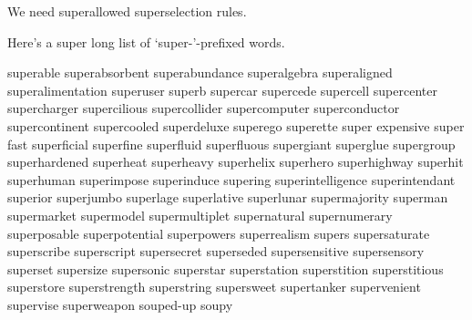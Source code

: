 We need superallowed superselection rules.

Here's a super long list of `super-'-prefixed words.

superable
superabsorbent
superabundance
superalgebra
superaligned
superalimentation
superuser
superb
supercar
supercede
supercell
supercenter
supercharger
supercilious
supercollider
supercomputer
superconductor
supercontinent
supercooled
superdeluxe
superego
superette
super expensive
super fast
superficial
superfine
superfluid
superfluous
supergiant
superglue
supergroup
superhardened
superheat
superheavy
superhelix
superhero
superhighway
superhit
superhuman
superimpose
superinduce
supering
superintelligence
superintendant
superior
superjumbo
superlage
superlative
superlunar
supermajority
superman
supermarket
supermodel
supermultiplet
supernatural
supernumerary
superposable
superpotential
superpowers
superrealism
supers
supersaturate
superscribe
superscript
supersecret
superseded
supersensitive
supersensory
superset
supersize
supersonic
superstar
superstation
superstition
superstitious
superstore
superstrength
superstring
supersweet
supertanker
supervenient
supervise
superweapon
souped-up
soupy